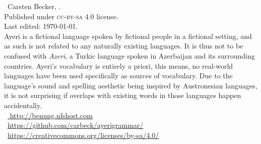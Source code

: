 

\begin{minipage}[b][\textheight][b]{0.67\textwidth}\small
\ccbysa~Carsten Becker, \the\year.\\
Published under \textsc{cc-by-sa} 4.0 license.\\
Last edited: \today{}.\\[.5\baselineskip]


Ayeri is a fictional language spoken by fictional people in a fictional setting, 
and as such is not related to any naturally existing languages. It is thus not 
to be confused with \emph{Azeri}, a Turkic language spoken in Azerbaijan and its 
surrounding countries. Ayeri’s vocabulary is entirely a priori, this means, no 
real-world languages have been used specifically as sources of vocabulary. Due 
to the language’s sound and spelling aesthetic being inspired by Austronesian 
languages, it is not surprising if overlaps with existing words in those 
languages happen accidentally.\\[.5\baselineskip]

~\href{http://benung.nfshost.com}{%
http://benung.nfshost.com}\\
%
~\href{https://github.com/carbeck/ayerigrammar}
{https://github.com/carbeck/ayerigrammar/}\\
%
~\href{%
https://creativecommons.org/licenses/by-sa/4.0/}%
{https://creativecommons.org/licenses/by-sa/4.0/}%

\end{minipage}
